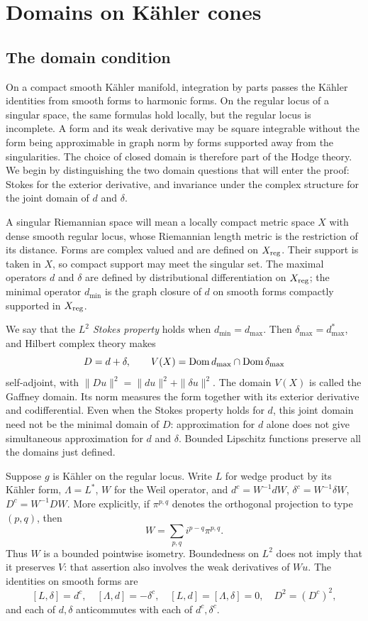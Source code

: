 \section{Domains on K\"ahler cones}\label{sec:cones}

\subsection{The domain condition}
On a compact smooth K\"ahler manifold, integration by parts passes
the K\"ahler identities from smooth forms to harmonic forms. On the
regular locus of a singular space, the same formulas hold locally,
but the regular locus is incomplete. A form and its weak derivative
may be square integrable without the form being approximable in
graph norm by forms supported away from the singularities. The
choice of closed domain is therefore part of the Hodge theory.
We begin by distinguishing the two domain questions that will enter
the proof: Stokes for the exterior derivative, and invariance under
the complex structure for the joint domain of $d$ and $\delta$.

A singular Riemannian space will mean a locally compact metric space
$X$ with dense smooth regular locus, whose Riemannian length metric
is the restriction of its distance. Forms are complex valued and
are defined on $X_{\mathrm{reg}}$. Their support is taken in $X$, so compact
support may meet the singular set. The maximal operators $d$ and
$\delta$ are defined by distributional differentiation on
$X_{\mathrm{reg}}$; the minimal operator $d_{\min}$ is the graph closure
of $d$ on smooth forms compactly supported in $X_{\mathrm{reg}}$.

We say that the \emph{$L^2$ Stokes property} holds when
$d_{\min}=d_{\max}$. Then
$\delta_{\max}=d_{\max}^*$, and Hilbert complex theory
\cite{brl92} makes
\[
 D=d+\delta,\qquad V(X)=\operatorname{Dom} d_{\max}\cap\operatorname{Dom}\delta_{\max}
\]
self-adjoint, with
$\|Du\|^2=\|du\|^2+\|\delta u\|^2$.
The domain $V(X)$ is called the Gaffney domain. Its norm measures
the form together with its exterior derivative and codifferential.
Even when the Stokes property holds for $d$, this joint domain need
not be the minimal domain of $D$: approximation for $d$ alone does
not give simultaneous approximation for $d$ and $\delta$.
Bounded Lipschitz functions preserve all the domains just defined.

Suppose $g$ is K\"ahler on the regular locus. Write $L$ for wedge
product by its K\"ahler form, $\Lambda=L^*$, $W$ for the Weil
operator, and $d^c=W^{-1}dW$, $\delta^c=W^{-1}\delta W$,
$D^c=W^{-1}DW$. More explicitly, if $\pi^{p,q}$ denotes the
orthogonal projection to type $(p,q)$, then
\[
 W=\sum_{p,q}i^{p-q}\pi^{p,q}.
\]
Thus $W$ is a bounded pointwise isometry. Boundedness on $L^2$
does not imply that it preserves $V$: that assertion also involves
the weak derivatives of $Wu$. The identities on smooth forms are
\begin{equation}\label{eq:kahler-id}
 [L,\delta]=d^c,\quad [\Lambda,d]=-\delta^c,\quad
 [L,d]=[\Lambda,\delta]=0,\quad D^2=(D^c)^2,
\end{equation}
and each of $d,\delta$ anticommutes with each of $d^c,\delta^c$.

